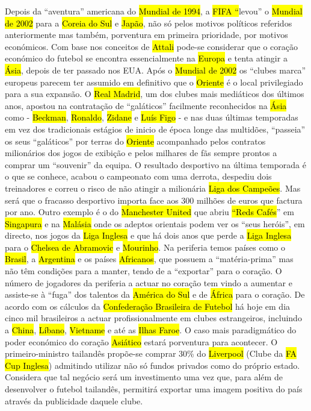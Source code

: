 \documentclass[a4paper,12pt]{article}
\begin{document}
Depois da “aventura” americana do \hl{Mundial de 1994}, a \hl{FIFA “}levou” o \hl{Mundial de 2002} para a \hl{Coreia do Sul} e \hl{Japão}, não só pelos motivos políticos referidos anteriormente mas também, porventura em primeira prioridade, por motivos económicos.
 Com base nos conceitos de \hl{Attali} pode-se considerar que o coração económico do futebol se encontra essencialmente na \hl{Europa} e tenta atingir a \hl{Ásia}, depois de ter passado nos EUA. Após o \hl{Mundial de 2002} os “clubes marca” europeus parecem ter assumido em definitivo que o \hl{Oriente} é o local privilegiado para a sua expansão. O \hl{Real Madrid}, um dos clubes mais mediáticos dos últimos anos, apostou na contratação de “galáticos” facilmente reconhecidos na \hl{Ásia} como - \hl{Beckman}, \hl{Ronaldo}, \hl{Zidane} e \hl{Luís Figo} - e nas duas últimas temporadas em vez dos tradicionais estágios de inicio de época longe das multidões, “passeia” os seus “galáticos” por terras do \hl{Oriente} acompanhado pelos contratos milionários dos jogos de exibição e pelos milhares de fãs sempre prontos a comprar um “souvenir” da equipa. O resultado desportivo na última temporada é o que se conhece, acabou o campeonato com uma derrota, despediu dois treinadores e correu o risco de não atingir a milionária \hl{Liga dos Campeões}. Mas será que o fracasso desportivo importa face aos 300 milhões de euros que factura por ano. Outro exemplo é o do \hl{Manchester United} que abriu \hl{“Reds Cafés}” em \hl{Singapura} e na \hl{Malásia} onde os adeptos orientais podem ver os “seus heróis”, em directo, nos jogos da \hl{Liga Inglesa} e que há dois anos que perde a \hl{Liga Inglesa} para o \hl{Chelsea de Abramovic} e \hl{Mourinho}.
 Na periferia temos países como o \hl{Brasil}, a \hl{Argentina} e os países \hl{Africanos}, que possuem a “matéria-prima” mas não têm condições para a manter, tendo de a “exportar” para o
 coração. O número de jogadores da periferia a actuar no coração tem vindo a aumentar e assiste-se à “fuga” dos talentos da \hl{América do Sul} e de \hl{África} para o coração. De acordo com os cálculos da \hl{Confederação Brasileira de Futebol} há hoje em dia cinco mil brasileiros a actuar profissionalmente em clubes estrangeiros, incluindo a \hl{China}, \hl{Líbano}, \hl{Vietname} e até as \hl{Ilhas Faroe}.
 O caso mais paradigmático do poder económico do coração \hl{Asiático} estará porventura para acontecer. O primeiro-ministro tailandês propõe-se comprar 30\% do \hl{Liverpool}
(Clube da \hl{FA Cup Inglesa}) admitindo utilizar não só fundos privados como do próprio estado. Considera que tal negócio será um investimento uma vez que, para além de desenvolver o futebol tailandês, permitirá exportar uma imagem positiva do país através da publicidade daquele clube.
\end{document}
